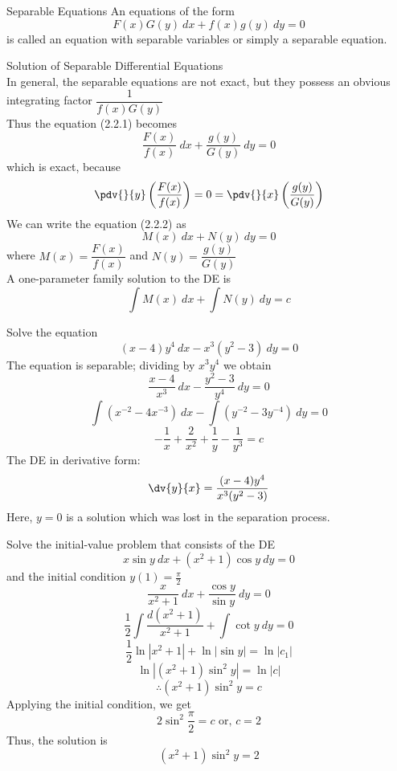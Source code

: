 \begin{definition}{Separable Equations}{}
    An equations of the form
    \begin{equation}
        F(x)G(y) \: d{x} + f(x)g(y) \: d{y} = 0
    \end{equation}
    is called an equation with separable variables or simply a separable equation.
\end{definition}

\begin{theorem}{Solution of Separable Differential Equations}{}
    \\In general, the separable equations are not exact, but they possess an obvious integrating factor $\dfrac{1}{f(x)G(y)}$ \\
    Thus the equation (2.2.1) becomes
    \begin{equation}
        \frac{F(x)}{f(x)} \: d{x} + \frac{g(y)}{G(y)} \: d{y} = 0
    \end{equation}
    which is exact, because \[
        \pdv{}{y} \left( \frac{F(x)}{f(x)} \right) = 0 = \pdv{}{x} \left( \frac{g(y)}{G(y)} \right)
    \]
    We can write the equation (2.2.2) as \[
        M(x) \: d{x} + N(y) \: d{y} = 0
    \] where $M(x) = \dfrac{F(x)}{f(x)}$ and $N(y) = \dfrac{g(y)}{G(y)}$ \\
    A one-parameter family solution to the DE is
    \begin{equation}
        \int{M(x)} \: d{x} + \int{N(y)} \: d{y} = c
    \end{equation}
\end{theorem}

\begin{example}{Solve the equation \[
    (x-4)y^4 \: d{x} - x^3(y^2-3) \: d{y} = 0
\]}{}
    The equation is separable; dividing by $x^3y^4$ we obtain
    \[ \frac{x-4}{x^3} \: d{x} - \frac{y^2-3}{y^4} \: d{y} = 0 \]
    \[ \int{(x^{-2} - 4x^{-3})} \: d{x} - \int{(y^{-2} - 3y^{-4})} \: d{y} = 0 \]
    \[ \boxed{-\frac{1}{x} + \frac{2}{x^2} + \frac{1}{y} - \frac{1}{y^3} = c} \]
    The DE in derivative form:
    \[ \dv{y}{x} = \frac{(x-4)y^4}{x^3(y^2-3)} \]
    Here, $y=0$ is a solution which was lost in the separation process.
\end{example}

\begin{example}{Solve the initial-value problem that consists of the DE \[
        x\sin{y} \: d{x} + (x^2+1)\cos{y} \: d{y} = 0
\] and the initial condition $y(1) = \frac{\pi}{2}$}{}
    \[ \frac{x}{x^2+1} \: d{x} + \frac{\cos y}{\sin y} \: d{y} = 0 \]
    \[ \frac{1}{2}\int{\frac{d(x^2+1)}{x^2+1}} + \int{\cot y} \: d{y} = 0 \]
    \[ \frac{1}{2}\ln|x^2+1| + \ln|\sin y| = \ln|c_1| \]
    \[ \ln|(x^2+1)\sin^2 y| = \ln|c| \]
    \[ \therefore (x^2+1)\sin^2y = c \]
    Applying the initial condition, we get \[
        2\sin^2\frac{\pi}{2} = c \text{ or, } c = 2
    \] Thus, the solution is
    \[ \boxed{(x^2+1)\sin^2y = 2} \]
\end{example}


